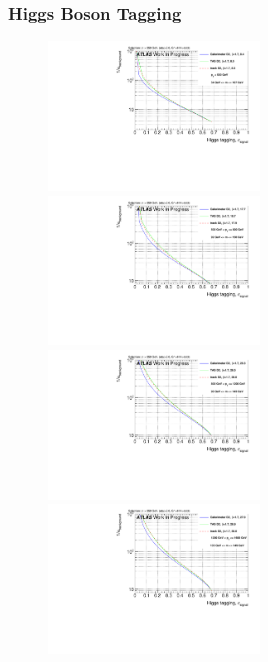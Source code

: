 \subsubsection{Higgs Boson Tagging}
\begin{figure}[H]
\includegraphics[width=0.5\textwidth]{sascha_input/Appendix/Higgs_best/ROC_ALL_h_recoJet_D2_17_bin1.pdf} \hspace{1mm}
\includegraphics[width=0.5\textwidth]{sascha_input/Appendix/Higgs_best/ROC_ALL_h_recoJet_D2_17_bin2.pdf}
\bigskip
\includegraphics[width=0.5\textwidth]{sascha_input/Appendix/Higgs_best/ROC_ALL_h_recoJet_D2_17_bin3.pdf} \hspace{1mm}
\includegraphics[width=0.5\textwidth]{sascha_input/Appendix/Higgs_best/ROC_ALL_h_recoJet_D2_17_bin4.pdf}

\end{figure}
